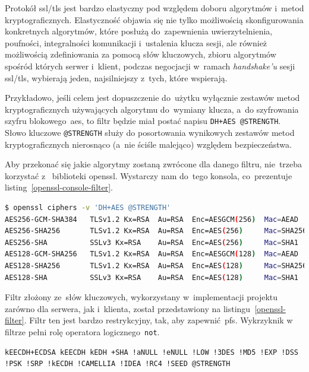 \documentclass[thesis]{subfiles}
\begin{document}
Protokół \gls{ssl/tls} jest bardzo elastyczny pod względem doboru algorytmów i~metod kryptograficznych. Elastyczność objawia się nie tylko możliwością skonfigurowania konkretnych algorytmów, które posłużą do~zapewnienia uwierzytelnienia, poufności, integralności komunikacji i~ustalenia klucza sesji, ale również możliwością zdefiniowania za pomocą słów kluczowych, zbioru algorytmów spośród których serwer i~klient, podczas negocjacji w~ramach \emph{handshake'u} sesji \gls{ssl/tls}, wybierają jeden, najsilniejszy z~tych, które wspierają.

Przykładowo, jeśli celem jest dopuszczenie do~użytku wyłącznie zestawów metod kryptograficznych używających algorytmu  do~wymiany klucza, a~do szyfrowania szyfru blokowego~\gls{aes}, to filtr będzie miał postać napisu \texttt{DH+AES @STRENGTH}. Słowo kluczowe \texttt{@STRENGTH} służy do posortowania wynikowych zestawów metod kryptograficznych nierosnąco (a~nie ściśle malejąco) względem bezpieczeństwa.

Aby przekonać się jakie algorytmy zostaną zwrócone dla danego filtru, nie~trzeba korzystać z~ biblioteki \gls{openssl}. Wystarczy nam do~tego konsola, co~prezentuje listing~\ref{openssl-console-filter}.\\

\begin{lstlisting}[numbers=none,language=bash,caption={Wynik filtrowania zestawów algorytmów w~konsoli za~pomocą \gls{openssl}},label=openssl-console-filter]
$ openssl ciphers -v 'DH+AES @STRENGTH'
AES256-GCM-SHA384   TLSv1.2 Kx=RSA  Au=RSA  Enc=AESGCM(256)  Mac=AEAD
AES256-SHA256       TLSv1.2 Kx=RSA  Au=RSA  Enc=AES(256)     Mac=SHA256
AES256-SHA          SSLv3 Kx=RSA    Au=RSA  Enc=AES(256)     Mac=SHA1
AES128-GCM-SHA256   TLSv1.2 Kx=RSA  Au=RSA  Enc=AESGCM(128)  Mac=AEAD
AES128-SHA256       TLSv1.2 Kx=RSA  Au=RSA  Enc=AES(128)     Mac=SHA256
AES128-SHA          SSLv3 Kx=RSA    Au=RSA  Enc=AES(128)     Mac=SHA1
\end{lstlisting}

Filtr złożony ze~słów kluczowych, wykorzystany w~implementacji projektu zarówno dla serwera, jak i~klienta, został przedstawiony na listingu~\ref{openssl-filter}. Filtr ten jest bardzo restrykcyjny, tak, aby zapewnić~\gls{pfs}. Wykrzyknik w filtrze pełni rolę operatora logicznego~\texttt{not}.\\

\begin{lstlisting}[numbers=none,caption={Filtr \gls{openssl} dla algorytmów użytych w~projekcie},label=openssl-filter]
kEECDH+ECDSA kEECDH kEDH +SHA !aNULL !eNULL !LOW !3DES !MD5 !EXP !DSS !PSK !SRP !kECDH !CAMELLIA !IDEA !RC4 !SEED @STRENGTH
\end{lstlisting}
\end{document}
